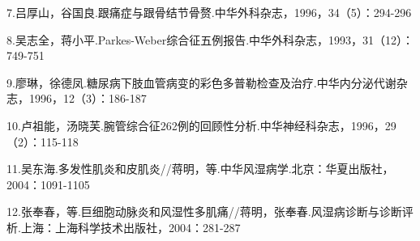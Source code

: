 7.吕厚山，谷国良.跟痛症与跟骨结节骨赘.中华外科杂志，1996，34（5）：294-296

8.吴志全，蒋小平.Parkes-Weber综合征五例报告.中华外科杂志，1993，31（12）：749-751

9.廖琳，徐德凤.糖尿病下肢血管病变的彩色多普勒检查及治疗.中华内分泌代谢杂志，1996，12（3）：186-187

10.卢祖能，汤晓芙.腕管综合征262例的回顾性分析.中华神经科杂志，1996，29（2）：115-118

11.吴东海.多发性肌炎和皮肌炎//蒋明，等.中华风湿病学.北京：华夏出版社，2004：1091-1105

12.张奉春，等.巨细胞动脉炎和风湿性多肌痛//蒋明，张奉春.风湿病诊断与诊断评析.上海：上海科学技术出版社，2004：281-287

\protect\hypertarget{text00346.html}{}{}


